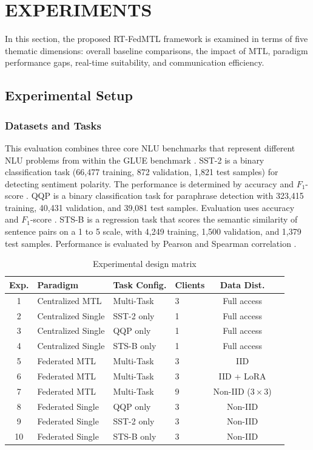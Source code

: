 \section{EXPERIMENTS}
\label{sec:experiments}
In this section, the proposed RT-FedMTL framework is examined in terms of five thematic dimensions: overall baseline comparisons, the impact of MTL, paradigm performance gaps, real-time suitability, and communication efficiency.  
\subsection{Experimental Setup}  
\subsubsection{Datasets and Tasks}  
This evaluation combines three core NLU benchmarks that represent different NLU problems from within the GLUE benchmark \cite{wang2018glue}. SST-2 \cite{socher2013recursive} is a binary classification task (66,477 training, 872 validation, 1,821 test samples) for detecting sentiment polarity. The performance is determined by accuracy and $F_1$-score \cite{van1979information}. QQP \cite{sharma2019natural} is a binary classification task for paraphrase detection with 323,415 training, 40,431 validation, and 39,081 test samples. Evaluation uses accuracy and $F_1$-score \cite{van1979information}. STS-B \cite{cer2017semeval} is a regression task that scores the semantic similarity of sentence pairs on a 1 to 5 scale, with 4,249 training, 1,500 validation, and 1,379 test samples. Performance is evaluated by Pearson \cite{pearson1895vii} and Spearman correlation \cite{spearman1961proof}.


\begin{table}[t]
  \centering
  \caption{Experimental design matrix}
  \label{tab:design_matrix}
  \footnotesize
  \setlength{\tabcolsep}{4pt}
  \begin{tabular}{clllcc}
    \toprule
    Exp. & Paradigm & Task Config. & Clients & Data Dist. \\
    \midrule
    1  & Centralized MTL    & Multi-Task  & 3 & Full access \\
    2  & Centralized Single & SST-2 only  & 1 & Full access \\
    3  & Centralized Single & QQP only    & 1 & Full access \\
    4  & Centralized Single & STS-B only  & 1 & Full access \\
    5  & Federated MTL      & Multi-Task  & 3 & IID \\
    6  & Federated MTL      & Multi-Task  & 3 & IID + LoRA \\
    7  & Federated MTL      & Multi-Task  & 9 & Non-IID ($3{\times}3$) \\
    8  & Federated Single   & QQP only    & 3 & Non-IID \\
    9  & Federated Single   & SST-2 only  & 3 & Non-IID \\
    10 & Federated Single   & STS-B only  & 3 & Non-IID \\
    \bottomrule
  \end{tabular}
\end{table}

